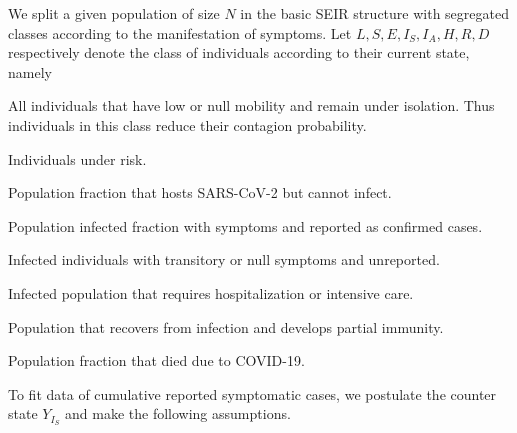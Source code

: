     We split a given population of size $N$ in the basic SEIR
structure with segregated classes according to the manifestation
of symptoms. Let $L, S, E, I_S, I_A, H, R, D$ respectively denote the
class of individuals according to their current state, namely
%
\begin{description}[%
    labelwidth=\widthof{\textbf{Infected-Asymptomatic $(I_A)$}},
    leftmargin=\widthof{\textbf{Infected-Asymptomatic $(I_A)$}},
    align=right%
]
    \item[Lockdown $(L)$:]
        All individuals that have low or null mobility and remain under
        isolation. Thus individuals in this class reduce their contagion 
        probability.
    \item[Susceptible $(S)$:]
        Individuals under risk.
    \item[Exposed $(E)$:]
        Population fraction that hosts SARS-CoV-2 but cannot infect.
    \item[Infected-Symptomatic $(I_S)$:]
        Population infected fraction with symptoms and reported as confirmed
        cases.
    \item[Infected-Asymptomatic $(I_A)$:]
        Infected individuals with transitory or null symptoms and unreported.
    \item[Hospitalized $(H)$:]
        Infected population that requires hospitalization or intensive care.
    \item[Recover or removed $(R)$:]
        Population that recovers from infection and develops partial immunity.
    \item[Death $(D)$:]
        Population fraction that died due to COVID-19.
\end{description}
%
To fit data of cumulative reported symptomatic cases, we
postulate the counter state $Y_{I_S}$ and make the following assumptions.
%
%
